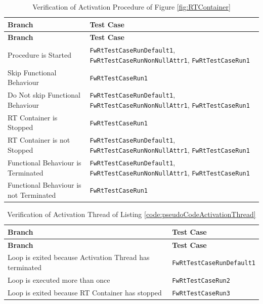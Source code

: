 \documentclass[requirements]{../fwprofile}
\begin{document}
\begin{longtable}{|p{5.7cm}|p{5.5cm}|}
\caption{Verification of Activation Procedure of Figure \ref{fig:RTContainer}}
\label{tab:RT_Activ} \\
\hline
\rowcolor{gray}
\textbf{Branch} & \textbf{Test Case} \\
\hline
\endfirsthead
\rowcolor{gray}
\textbf{Branch} & \textbf{Test Case} \\
\hline
\endhead
Procedure is Started & \texttt{FwRtTestCaseRunDefault1}, \texttt{FwRtTestCaseRunNonNullAttr1}, \texttt{FwRtTestCaseRun1} \\
\hline
Skip Functional Behaviour & \texttt{FwRtTestCaseRun1} \\
\hline
Do Not skip Functional Behaviour & \texttt{FwRtTestCaseRunDefault1}, \texttt{FwRtTestCaseRunNonNullAttr1}, \texttt{FwRtTestCaseRun1} \\
\hline
RT Container is Stopped & \texttt{FwRtTestCaseRun1} \\
\hline
RT Container is not Stopped & \texttt{FwRtTestCaseRunDefault1}, \texttt{FwRtTestCaseRunNonNullAttr1}, \texttt{FwRtTestCaseRun1}\\
\hline
Functional Behaviour is Terminated & \texttt{FwRtTestCaseRunDefault1}, \texttt{FwRtTestCaseRunNonNullAttr1}, \texttt{FwRtTestCaseRun1}\\
\hline
Functional Behaviour is not Terminated & \texttt{FwRtTestCaseRun1}\\
\hline
\end{longtable}

\begin{longtable}{|p{5.7cm}|p{5.5cm}|}
\caption{Verification of Activation Thread of Listing \ref{code:pseudoCodeActivationThread}}
\label{tab:RT_Thread} \\
\hline
\rowcolor{gray}
\textbf{Branch} & \textbf{Test Case} \\
\hline
\endfirsthead
\rowcolor{gray}
\textbf{Branch} & \textbf{Test Case} \\
\hline
\endhead
Loop is exited because Activation Thread has terminated & \texttt{FwRtTestCaseRunDefault1} \\
\hline
Loop is executed more than once & \texttt{FwRtTestCaseRun2} \\
\hline
Loop is exited because RT Container has stopped & \texttt{FwRtTestCaseRun3} \\
\hline
\end{longtable}
\end{document}
